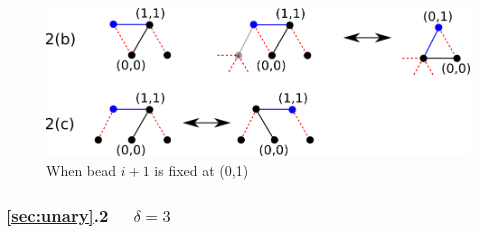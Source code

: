 \begin{figure}
	\centering
	\includegraphics[width=0.8\linewidth]{./Fig/hexagonOut3n}
	
	\caption{When bead $i+1$ is fixed at (0,1)}
	\label{fig:hexagonOut2}
\end{figure}


\subsubsection{\ref{sec:unary}.2 \ \ $\delta = 3$\\}

